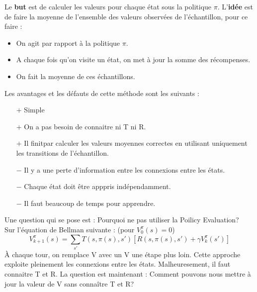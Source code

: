 \label{ssubsub:direct_evaluation}
Le \textbf{but} est de calculer les valeurs pour chaque état sous la politique $\pi$. L'\textbf{idée} est de faire la moyenne
de l'ensemble des valeurs observées de l'échantillon, pour ce faire :
\begin{itemize}[label=\textbullet]
    \item On agit par rapport à la politique $\pi$.
    \item A chaque fois qu'on visite un état, on met à jour la somme des récompenses.
    \item On fait la moyenne de ces échantillons.
\end{itemize}
Les avantages et les défauts de cette méthode sont les suivants :
\begin{itemize}[label=\textbullet]
    \item[$+$] Simple
    \item[$+$] On a pas besoin de connaitre ni T ni R.
    \item[$+$] Il finitpar calculer les valeurs moyennes correctes en utilisant uniquement les transitions de l'échantillon.
    \item[$-$] Il y a une perte d'information entre les connexions entre les états.
    \item[$-$] Chaque état doit être apppris indépendamment.
    \item[$-$] Il faut beaucoup de temps pour apprendre. 
\end{itemize}

\label{ssubsub:td_learning}
Une question qui se pose est : Pourquoi ne pas utiliser la Poilicy Evaluation?\\
Sur l'équation de Bellman suivante : (pour $V_0^{\pi}(s)=0$)
\begin{equation*}
    V_{k+1}^{\pi}(s)=\sum_{s'}T(s,\pi(s),s')[R(s,\pi(s),s')+\gamma V_k^{\pi}(s')]
\end{equation*}
À chaque tour, on remplace V avec un V une étape plus loin. Cette approche exploite pleinement les connexions entre les états.
Malheuresement, il faut connaitre T et R. La question est maintenant : Comment pouvons nous mettre à jour la valeur de V sans
connaître T et R?

